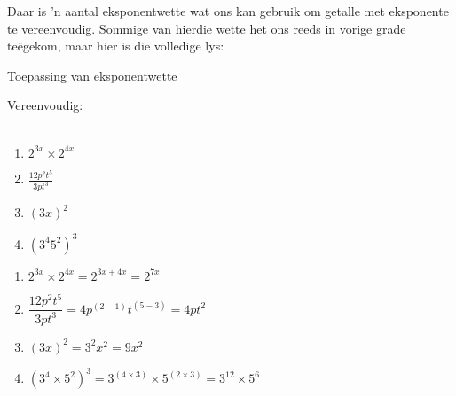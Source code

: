 Daar is 'n aantal eksponentwette wat ons kan gebruik om getalle met eksponente te vereenvoudig. Sommige
van hierdie wette het ons reeds in vorige grade teëgekom, maar hier is die volledige lys:




\begin{wex}
{ %
Toepassing van eksponentwette
}
{%
Vereenvoudig:\\
\\
\begin{minipage}{\textwidth}
\begin{enumerate}[itemsep=6pt, label=\textbf{\arabic*}.]
\item  $2^{3x} \times 2^{4x}$
\item $\frac{12p^2t^5}{3pt^3}$
\item $ (3x)^2 $
\item $(3^4 5^2)^3$
\end{enumerate}
\end{minipage}
}
{%
\begin{minipage}{\textwidth}
\begin{enumerate}[itemsep=6pt, label=\textbf{\arabic*}.]
\item  $2^{3x} \times 2^{4x} = 2^{3x+4x} = 2^{7x}$
 \item $\dfrac{12p^2t^5}{3pt^3} = 4p^{(2-1)}t^{(5-3)} = 4pt^2$
 \item $ (3x)^2 = 3^2x^2 = 9x^2$
 \item $(3^4\times5^2)^3 = 3^{(4\times3)}\times5^{(2\times3)} = 3^{12}\times5^6 $
\end{enumerate}
\end{minipage}
}
\end{wex}


